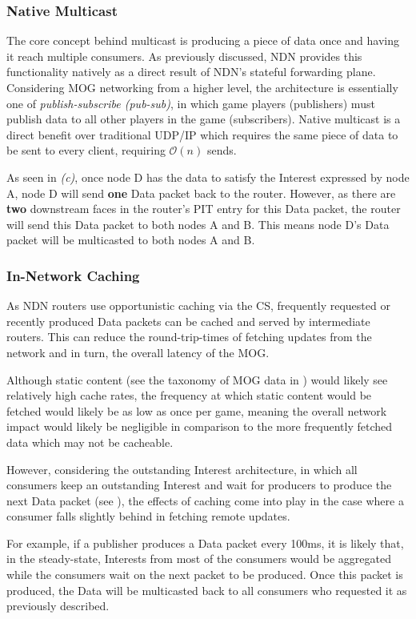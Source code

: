 \subsubsection*{Native Multicast}
The core concept behind multicast is producing a piece of data once and having it reach multiple consumers. As previously discussed, NDN provides this functionality natively as a direct result of NDN's stateful forwarding plane. Considering MOG networking from a higher level, the architecture is essentially one of \textit{publish-subscribe (pub-sub)}, in which game players (publishers) must publish data to all other players in the game (subscribers). Native multicast is a direct benefit over traditional UDP/IP which requires the same piece of data to be sent to every client, requiring $\mathcal{O}(n)$ sends. 

As seen in  \textit{(c)}, once node D has the data to satisfy the Interest expressed by node A, node D will send \textbf{one} Data packet back to the router. However, as there are \textbf{two} downstream faces in the router's PIT entry for this Data packet, the router will send this Data packet to both nodes A and B. This means node D's Data packet will be multicasted to both nodes A and B. 

\subsubsection*{In-Network Caching}
As NDN routers use opportunistic caching via the CS, frequently requested or recently produced Data packets can be cached and served by intermediate routers. This can reduce the round-trip-times of fetching updates from the network and in turn, the overall latency of the MOG. 

Although static content (see the taxonomy of MOG data in ) would likely see relatively high cache rates, the frequency at which static content would be fetched would likely be as low as once per game, meaning the overall network impact would likely be negligible in comparison to the more frequently fetched data which may not be cacheable. 

However, considering the outstanding Interest architecture, in which all consumers keep an outstanding Interest and wait for producers to produce the next Data packet (see ), the effects of caching come into play in the case where a consumer falls slightly behind in fetching remote updates. 

For example, if a publisher produces a Data packet every 100ms, it is likely that, in the steady-state, Interests from most of the consumers would be aggregated while the consumers wait on the next packet to be produced. Once this packet is produced, the Data will be multicasted back to all consumers who requested it as previously described. 


